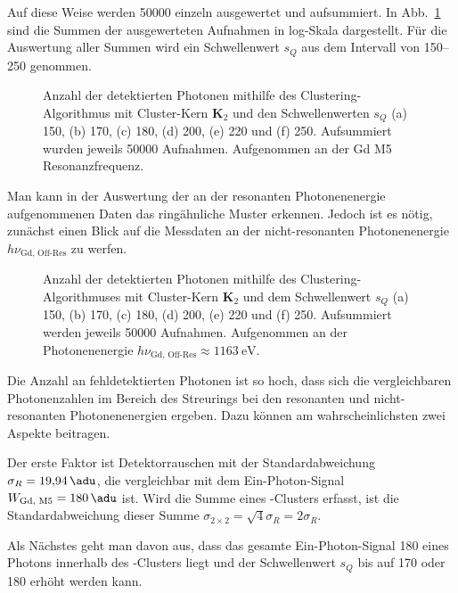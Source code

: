 \noindent
Auf diese Weise werden \SI{50000}{\captures} einzeln ausgewertet und aufsummiert. In Abb.~\ref{fig:cl_2_150_170_180_200_220_250_resonance} sind die Summen der ausgewerteten Aufnahmen in log-Skala dargestellt. Für die Auswertung aller Summen wird ein Schwellenwert $s_Q$ aus dem Intervall von \SIrange{150}{250}{\adu} genommen.
\begin{figure}[H]
    \centering
    
    \caption{Anzahl der detektierten Photonen mithilfe des Clustering-Algorithmus mit Cluster-Kern $\mathbf{K}_2$ und den Schwellenwerten $s_Q$ (a) \SI{150}{\adu}, (b) \SI{170}{\adu}, (c) \SI{180}{\adu}, (d) \SI{200}{\adu}, (e) \SI{220}{\adu} und (f) \SI{250}{\adu}. Aufsummiert wurden jeweils \num{50000} Aufnahmen. Aufgenommen an der Gd M5 Resonanzfrequenz.}
    \label{fig:cl_2_150_170_180_200_220_250_resonance}
\end{figure}
\noindent
Man kann in der Auswertung der an der resonanten Photonenenergie aufgenommenen Daten das ringähnliche Muster erkennen. Jedoch ist es nötig, zunächst einen Blick auf die Messdaten an der nicht-resonanten Photonenenergie $h\nu_\text{Gd, Off-Res}$ zu werfen.
\begin{figure}[H]
    \centering
    
    \caption{Anzahl der detektierten Photonen mithilfe des Clustering-Algorithmuses mit Cluster-Kern $\mathbf{K}_2$ und dem Schwellenwert $s_Q$ (a) \SI{150}{\adu}, (b) \SI{170}{\adu}, (c) \SI{180}{\adu}, (d) \SI{200}{\adu}, (e) \SI{220}{\adu} und (f) \SI{250}{\adu}. Aufsummiert werden jeweils \num{50000} Aufnahmen. Aufgenommen an der Photonenenergie $h\nu_\text{Gd, Off-Res} \approx \SI{1163}{\eV}$.}
    \label{fig:cl_150_170_180_200_220_250_off_resonance}
\end{figure}
\noindent
Die Anzahl an fehldetektierten Photonen ist so hoch, dass sich die vergleichbaren Photonenzahlen im Bereich des Streurings bei den resonanten und nicht-resonanten Photonenenergien ergeben. Dazu können am wahrscheinlichsten zwei Aspekte beitragen. 

\noindent
Der erste Faktor ist Detektorrauschen mit der Standardabweichung $\sigma_R = \SI{19.94}{\adu}$, die vergleichbar mit dem Ein-Photon-Signal $W_\text{Gd, M5} = \SI{180}{\adu}$ ist. Wird die Summe eines -Clusters erfasst, ist die Standardabweichung dieser Summe $\sigma_{2\times 2} = \sqrt{4}\sigma_R = 2\sigma_R$. 

\noindent
Als Nächstes geht man davon aus, dass das gesamte Ein-Photon-Signal \SI{180}{\adu} eines Photons innerhalb des -Clusters liegt und der Schwellenwert $s_Q$ bis auf \SI{170}{\adu} oder \SI{180}{\adu} erhöht werden kann.

